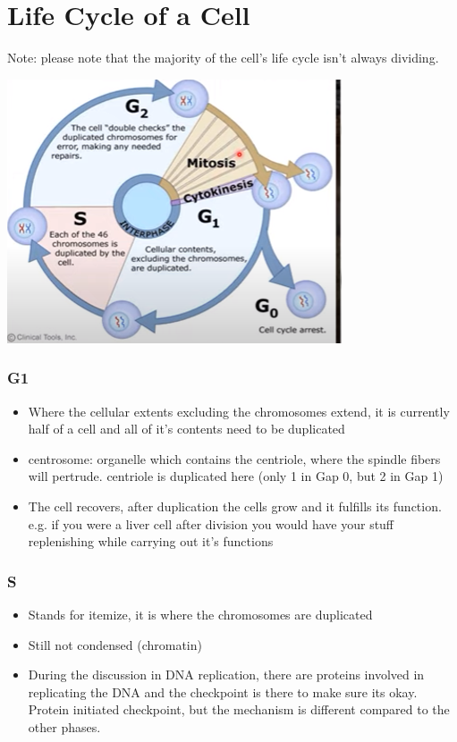 \documentclass{article}
\begin{document}
\section*{Life Cycle of a Cell}
Note: please note that the majority of the cell's life cycle isn't  always dividing.

\includegraphics*[scale=0.8]{celllifecycle.png}

\subsubsection*{G1}
\begin{itemize}
    \item Where the cellular extents excluding the chromosomes extend, it is currently half of a cell and all of it's contents need to be duplicated
    \item centrosome: organelle which contains the centriole, where the spindle fibers will pertrude. centriole is duplicated here (only 1 in Gap 0, but 2 in Gap 1)
    \item The cell recovers, after duplication the cells grow and it fulfills its function. e.g. if you were a liver cell after division you would have your stuff replenishing while carrying out it's functions
\end{itemize}
\subsubsection*{S}
\begin{itemize}
    \item Stands for itemize, it is where the chromosomes are duplicated
    \item Still not condensed (chromatin)
    \item During the discussion in DNA replication, there are proteins involved in replicating the DNA and the checkpoint is there to make sure its okay. Protein initiated checkpoint, but the mechanism is different compared to the other phases.
\end{itemize}
\end{document}
